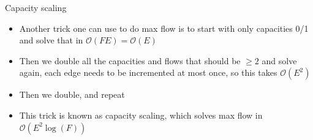 \documentclass{beamer}
\begin{document}
	\begin{frame}[plain]{Capacity scaling}
		\begin{itemize}
			\item Another trick one can use to do max flow is to start with only capacities 0/1 and solve that in $\mathcal{O}(FE) = \mathcal{O}(E)$
			\item Then we double all the capacities and flows that should be $\geq 2$ and solve again, each edge needs to be incremented at most once,
			 so this takes $\mathcal{O}(E^2)$
			 \item Then we double, and repeat
			 \item This trick is known as capacity scaling, which solves max flow in $\mathcal{O}(E^2 \log(F))$
		\end{itemize}
	\end{frame}
	
\end{document}
